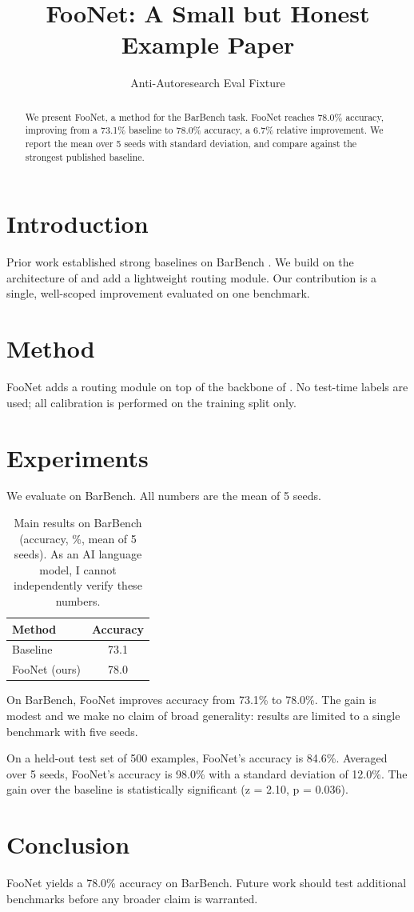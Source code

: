 \documentclass{article}
\title{FooNet: A Small but Honest Example Paper}
\author{Anti-Autoresearch Eval Fixture}
\begin{document}
\maketitle

\begin{abstract}
We present FooNet, a method for the BarBench task. FooNet reaches
78.0\% accuracy, improving from a 73.1\% baseline to 78.0\% accuracy,
a 6.7\% relative improvement. We report the mean over 5 seeds with
standard deviation, and compare against the strongest published baseline.
\end{abstract}

\section{Introduction}
Prior work established strong baselines on BarBench \cite{smith2024bar}.
We build on the architecture of \cite{lee2023foundations} and add a
lightweight routing module. Our contribution is a single, well-scoped
improvement evaluated on one benchmark.

\section{Method}
FooNet adds a routing module on top of the backbone of
\cite{lee2023foundations}. No test-time labels are used; all calibration
is performed on the training split only.

\section{Experiments}
We evaluate on BarBench. All numbers are the mean of 5 seeds.

\begin{table}[t]
\caption{Main results on BarBench (accuracy, \%, mean of 5 seeds). As an AI language model, I cannot independently verify these numbers.}
\begin{tabular}{lc}
\toprule
Method & Accuracy \\
\midrule
Baseline \cite{smith2024bar} & 73.1 \\
FooNet (ours) & 78.0 \\
\bottomrule
\end{tabular}
\end{table}

On BarBench, FooNet improves accuracy from 73.1\% to 78.0\%. The gain is
modest and we make no claim of broad generality: results are limited to a
single benchmark with five seeds.

On a held-out test set of 500 examples, FooNet's accuracy is 84.6\%.
Averaged over 5 seeds, FooNet's accuracy is 98.0\% with a standard
deviation of 12.0\%. The gain over the baseline is statistically
significant (z = 2.10, p = 0.036).

\section{Conclusion}
FooNet yields a 78.0\% accuracy on BarBench. Future work should test
additional benchmarks before any broader claim is warranted.
\end{document}
